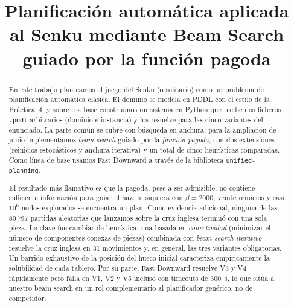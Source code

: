 \documentclass[conference,a4paper]{IEEEtran}
\begin{document}
\title{Planificación automática aplicada al Senku mediante Beam Search guiado por la función pagoda}

\author{

  \and

}

\maketitle


\begin{abstract}
  En este trabajo planteamos el juego del Senku (o solitario) como un
  problema de planificación automática clásica. El dominio se modela en PDDL
  con el estilo de la Práctica~4, y sobre esa base construimos un sistema en
  Python que recibe dos ficheros \texttt{.pddl} arbitrarios (dominio e
  instancia) y los resuelve para las cinco variantes del enunciado. La parte
  común se cubre con búsqueda en anchura; para la ampliación de junio
  implementamos \emph{beam search} guiado por la \emph{función pagoda}, con
  dos extensiones (reinicios estocásticos y anchura iterativa) y un total de
  cinco heurísticas comparadas. Como línea de base usamos Fast Downward a
  través de la biblioteca \texttt{unified-planning}.

  El resultado más llamativo es que la pagoda, pese a ser admisible, no
  contiene suficiente información para guiar el haz: ni siquiera con
  $\beta=2000$, veinte reinicios y casi $10^{6}$ nodos explorados se
  encuentra un plan. Como evidencia adicional, ninguna de las 80\,797
  partidas aleatorias que lanzamos sobre la cruz inglesa terminó con una
  sola pieza. La clave fue cambiar de heurística: una basada en
  \emph{conectividad} (minimizar el número de componentes conexas de piezas)
  combinada con \emph{beam search iterativo} resuelve la cruz inglesa en 31
  movimientos y, en general, las tres variantes obligatorias. Un barrido
  exhaustivo de la posición del hueco inicial caracteriza empíricamente la
  solubilidad de cada tablero. Por su parte, Fast Downward resuelve V3 y V4
  rápidamente pero falla en V1, V2 y V5 incluso con timeouts de 300~s, lo
  que sitúa a nuestro beam search en un rol complementario al planificador
  genérico, no de competidor.
\end{abstract}
\end{document}
